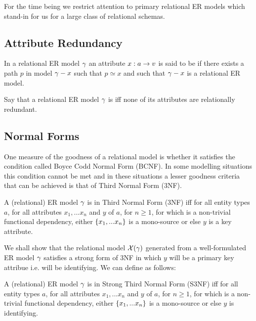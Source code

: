 For the time being we restrict attention to primary relational ER models which stand-in for us for a large class of relational schemas. 

\subsection{Attribute Redundancy}
\begin{definition}
In a relational ER model $\gamma$ an attribute $x: a \rightarrow v$ is said to be  if
there exists a path $p$ in model $\gamma - x$ such that $p \simeq x$ and such that $\gamma - x$ is 
a relational ER model.  
\end{definition}
\begin{definition}
Say that a relational ER model $\gamma$ is  iff none of its attributes are relationally redundant.
\end{definition}


\subsection{Normal Forms}

\noindent One measure of the goodness of a relational model is whether it satisfies the condition called Boyce Codd Normal Form (BCNF). In some modelling situations this condition cannot be 
met and in these situations a lesser goodness criteria that can be achieved is that of Third Normal Form (3NF). 

\begin{definition} %
A (relational) ER model $\gamma$ is in  Third Normal Form (3NF)  iff
for all entity types $a$, for all attributes $x_1,...x_n$ and $y$ of $a$, for $n \geq 1$, 
for which   is a non-trivial functional dependency, 
either $\left\{x_1,...x_n\right\}$ is a mono-source or else $y$ is a key attribute.
\end{definition}


We shall show that the relational model $\mathcal{X}(\gamma)$ generated from a well-formulated 
ER model $\gamma$ satisfies a strong form of 3NF in which $y$ will be a primary key attribue i.e. will be identifying.
We can define as follows:

\begin{definition} %
A (relational) ER model $\gamma$ is in Strong Third Normal Form (S3NF)  iff
for all entity types $a$, for all attributes $x_1,...x_n$ and $y$ of $a$, for $n \geq 1$, 
for which   is a non-trivial functional dependency, 
either $\left\{x_1,...x_n\right\}$ is a mono-source or else $y$ is identifying.
\end{definition}

